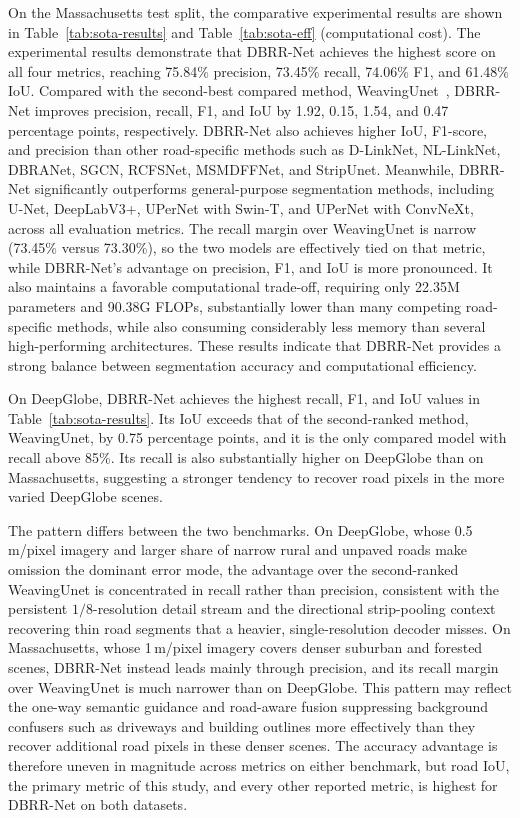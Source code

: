\documentclass[a4paper,fleqn, review]{cas-sc}
\begin{document}
\vspace{2pt}
\begin{minipage}{\tblwidth}
\raggedright
\footnotesize

\end{minipage}
On the Massachusetts test split, the comparative experimental results are shown in Table~\ref{tab:sota-results} and Table~\ref{tab:sota-eff} (computational cost). The experimental results demonstrate that DBRR-Net achieves the highest score on all four metrics, reaching 75.84\% precision, 73.45\% recall, 74.06\% F1, and 61.48\% IoU. Compared with the second-best compared method, WeavingUnet~\cite{weavingunet}, DBRR-Net improves precision, recall, F1, and IoU by 1.92, 0.15, 1.54, and 0.47 percentage points, respectively. DBRR-Net also achieves higher IoU, F1-score, and precision than other road-specific methods such as D-LinkNet, NL-LinkNet, DBRANet, SGCN, RCFSNet, MSMDFFNet, and StripUnet. Meanwhile, DBRR-Net significantly outperforms general-purpose segmentation methods, including U-Net, DeepLabV3+, UPerNet with Swin-T, and UPerNet with ConvNeXt, across all evaluation metrics. The recall margin over WeavingUnet is narrow (73.45\% versus 73.30\%), so the two models are effectively tied on that metric, while DBRR-Net's advantage on precision, F1, and IoU is more pronounced. It also maintains a favorable computational trade-off, requiring only 22.35M parameters and 90.38G FLOPs, substantially lower than many competing road-specific methods, while also consuming considerably less memory than several high-performing architectures. These results indicate that DBRR-Net provides a strong balance between segmentation accuracy and computational efficiency.

On DeepGlobe, DBRR-Net achieves the highest recall, F1, and IoU values in
Table~\ref{tab:sota-results}. Its IoU exceeds that of the second-ranked
method, WeavingUnet, by 0.75 percentage points, and it is the only compared model with
recall above 85\%. Its recall is also substantially higher on DeepGlobe than on
Massachusetts, suggesting a stronger tendency to recover road pixels in the
more varied DeepGlobe scenes.

The pattern differs between the two benchmarks. On DeepGlobe, whose
0.5\,m/pixel imagery and larger share of narrow rural and unpaved roads make
omission the dominant error mode, the advantage over the second-ranked WeavingUnet is
concentrated in recall rather than precision, consistent with the persistent
$1/8$-resolution detail stream and the directional strip-pooling context recovering thin road segments that a heavier,
single-resolution decoder misses. On Massachusetts, whose 1\,m/pixel imagery
covers denser suburban and forested scenes, DBRR-Net instead leads mainly
through precision, and its recall margin over WeavingUnet is much narrower than on DeepGlobe. This pattern may reflect
the one-way semantic guidance and road-aware fusion suppressing
background confusers such as driveways and building outlines more
effectively than they recover additional road pixels in these denser scenes.
The accuracy advantage is therefore uneven in magnitude across metrics on
either benchmark, but road IoU, the primary metric of this study, and every
other reported metric, is highest for DBRR-Net on both datasets.
\end{document}
